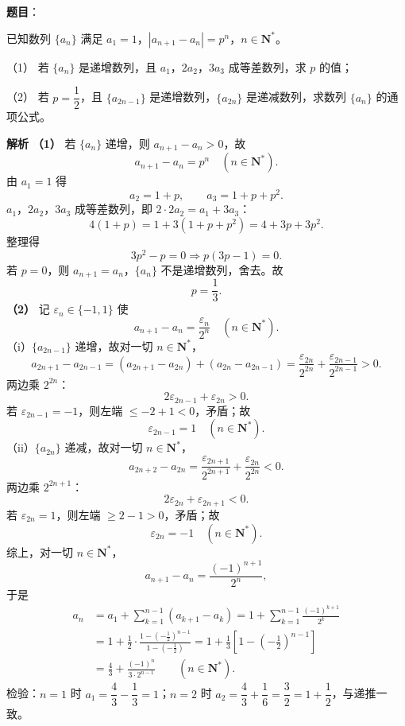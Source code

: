 \begin{answer}

\textbf{题目}：

已知数列 $\{a_n\}$ 满足 $a_1=1$，$|a_{n+1}-a_n|=p^n$，$n\in\mathbf N^*$。

（1） 若 $\{a_n\}$ 是递增数列，且 $a_1$，$2a_2$，$3a_3$ 成等差数列，求 $p$ 的值；

（2） 若 $p=\dfrac12$，且 $\{a_{2n-1}\}$ 是递增数列，$\{a_{2n}\}$ 是递减数列，求数列 $\{a_n\}$ 的通项公式。

\textbf{解析}
\textbf{（1）} 若 $\{a_n\}$ 递增，则 $a_{n+1}-a_n>0$，故
\nopagebreak[4]
\[a_{n+1}-a_n=p^n\quad(n\in\mathbf N^*).\]
由 $a_1=1$ 得
\nopagebreak[4]
\[a_2=1+p,\qquad a_3=1+p+p^2 .\]
$a_1$，$2a_2$，$3a_3$ 成等差数列，即 $2\cdot2a_2=a_1+3a_3$：
\nopagebreak[4]
\[4(1+p)=1+3\left(1+p+p^2\right)=4+3p+3p^2 .\]
整理得
\nopagebreak[4]
\[3p^2-p=0\Longrightarrow p(3p-1)=0 .\]
若 $p=0$，则 $a_{n+1}=a_n$，$\{a_n\}$ 不是递增数列，舍去。故
\nopagebreak[4]
\[p=\frac13 .\]
\textbf{（2）} 记 $\varepsilon_n\in\{-1,1\}$ 使
\nopagebreak[4]
\[a_{n+1}-a_n=\frac{\varepsilon_n}{2^n}\quad(n\in\mathbf N^*).\]
（i）$\{a_{2n-1}\}$ 递增，故对一切 $n\in\mathbf N^*$，
\nopagebreak[4]
\[a_{2n+1}-a_{2n-1}=\left(a_{2n+1}-a_{2n}\right)+\left(a_{2n}-a_{2n-1}\right)=\frac{\varepsilon_{2n}}{2^{2n}}+\frac{\varepsilon_{2n-1}}{2^{2n-1}}>0 .\]
两边乘 $2^{2n}$：
\nopagebreak[4]
\[2\varepsilon_{2n-1}+\varepsilon_{2n}>0 .\]
若 $\varepsilon_{2n-1}=-1$，则左端 $\leqslant-2+1<0$，矛盾；故
\nopagebreak[4]
\[\varepsilon_{2n-1}=1\quad(n\in\mathbf N^*).\]
（ii）$\{a_{2n}\}$ 递减，故对一切 $n\in\mathbf N^*$，
\nopagebreak[4]
\[a_{2n+2}-a_{2n}=\frac{\varepsilon_{2n+1}}{2^{2n+1}}+\frac{\varepsilon_{2n}}{2^{2n}}<0 .\]
两边乘 $2^{2n+1}$：
\nopagebreak[4]
\[2\varepsilon_{2n}+\varepsilon_{2n+1}<0 .\]
若 $\varepsilon_{2n}=1$，则左端 $\geqslant2-1>0$，矛盾；故
\nopagebreak[4]
\[\varepsilon_{2n}=-1\quad(n\in\mathbf N^*).\]
综上，对一切 $n\in\mathbf N^*$，
\nopagebreak[4]
\[a_{n+1}-a_n=\frac{(-1)^{n+1}}{2^n},\]
于是
\nopagebreak[4]
\[\begin{aligned}
a_n&=a_1+\sum_{k=1}^{n-1}\left(a_{k+1}-a_k\right)
=1+\sum_{k=1}^{n-1}\frac{(-1)^{k+1}}{2^k}\\
&=1+\frac12\cdot\frac{1-\left(-\frac12\right)^{n-1}}{1-\left(-\frac12\right)}
=1+\frac13\left[1-\left(-\frac12\right)^{n-1}\right]\\
&=\frac43+\frac{(-1)^n}{3\cdot2^{n-1}}\qquad(n\in\mathbf N^*).
\end{aligned}\]
检验：$n=1$ 时 $a_1=\dfrac43-\dfrac13=1$；$n=2$ 时 $a_2=\dfrac43+\dfrac16=\dfrac32=1+\dfrac12$，与递推一致。


\end{answer}
